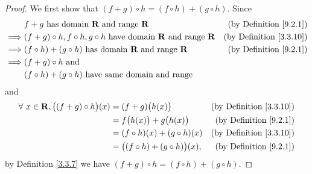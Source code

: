 \begin{proof}
    We first show that \((f + g) \circ h = (f \circ h) + (g \circ h)\).
    Since
    \begin{align*}
                 & f + g \text{ has domain } \mathbf{R} \text{ and range } \mathbf{R}                                   & \text{(by Definition \ref{9.2.1})}  \\
        \implies & (f + g) \circ h, f \circ h, g \circ h  \text{ have domain } \mathbf{R} \text{ and range } \mathbf{R} & \text{(by Definition \ref{3.3.10})} \\
        \implies & (f \circ h) + (g \circ h)  \text{ has domain } \mathbf{R} \text{ and range } \mathbf{R}              & \text{(by Definition \ref{9.2.1})}  \\
        \implies & (f + g) \circ h \text{ and }                                                                                                               \\
                 & (f \circ h) + (g \circ h) \text{ have same domain and range}
    \end{align*}
    and
    \begin{align*}
        \forall\ x \in \mathbf{R}, \big((f + g) \circ h\big)(x) & = (f + g)\big(h(x)\big)                   & \text{(by Definition \ref{3.3.10})} \\
                                                                & = f\big(h(x)\big) + g\big(h(x)\big)       & \text{(by Definition \ref{9.2.1})}  \\
                                                                & = (f \circ h)(x) + (g \circ h)(x)         & \text{(by Definition \ref{3.3.10})} \\
                                                                & = \big((f \circ h) + (g \circ h)\big)(x), & \text{(by Definition \ref{9.2.1})}
    \end{align*}
    by Definition \ref{3.3.7} we have \((f + g) \circ h = (f \circ h) + (g \circ h)\).


\end{proof}
